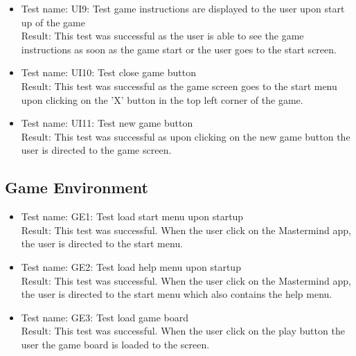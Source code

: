 \documentclass[12pt, titlepage]{article}
\begin{document}
\begin{itemize}
    \item Test name: UI9: Test game instructions are displayed to the user upon start up of the game \\
        Result: This test was successful as the user is able to see the game instructions as soon as the game start or the user goes to the start screen.
    \item Test name: UI10: Test close game button \\
        Result: This test was successful as the game screen goes to the start menu upon clicking on the 'X' button in the top left corner of the game.
    \item Test name: UI11: Test new game button \\
        Result: This test was successful as upon clicking on the new game button the user is directed to the game screen.
\end{itemize}
\subsection{Game Environment}
\begin{itemize}
    \item Test name: GE1: Test load start menu upon startup \\
        Result: This test was successful. When the user click on the Mastermind app, the user is directed to the start menu.
    \item Test name: GE2: Test load help menu upon startup \\
        Result: This test was successful. When the user click on the Mastermind app, the user is directed to the start menu which also contains the help menu.
    \item Test name: GE3: Test load game board \\
        Result: This test was successful. When the user click on the play button the user the game board is loaded to the screen.
\end{itemize}
\end{document}

